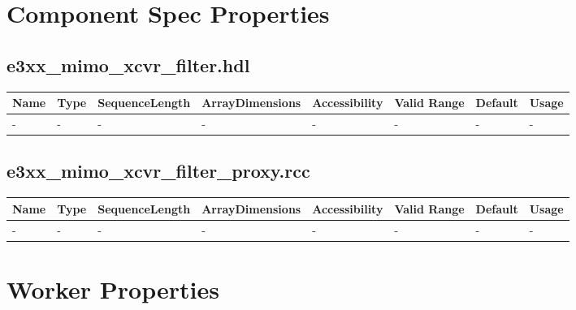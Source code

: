 \documentclass{article}
\def\comp{e3xx\_mimo\_xcvr\_filter}
\def\proxy{e3xx\_mimo\_xcvr\_filter\_proxy}
\begin{document}
\begin{landscape}
\section*{Component Spec Properties}
\subsection*{\comp.hdl}
	\begin{scriptsize}
		\begin{tabular}{|p{3.75cm}|p{1.25cm}|p{2cm}|p{2.75cm}|p{1.5cm}|p{1.5cm}|p{1cm}|p{6.23cm}|}
			\hline
            \rowcolor{blue}
            Name               & Type & SequenceLength & ArrayDimensions & Accessibility      & Valid Range & Default & Usage                                                                          \\
            \hline
            - & - & - & - & - & - & - & - \\
            \hline
        \end{tabular}
    \end{scriptsize}
\subsection*{\proxy.rcc}
	\begin{scriptsize}
		\begin{tabular}{|p{3.75cm}|p{1.25cm}|p{2cm}|p{2.75cm}|p{1.5cm}|p{1.5cm}|p{1cm}|p{6.23cm}|}
			\hline
            \rowcolor{blue}
            Name               & Type & SequenceLength & ArrayDimensions & Accessibility      & Valid Range & Default & Usage                                                                          \\
            \hline
            - & - & - & - & - & - & - & - \\
            \hline
        \end{tabular}
    \end{scriptsize}

\section*{Worker Properties}

\end{landscape}
\end{document}
